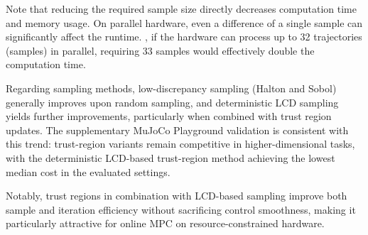 Note that reducing the required sample size directly decreases computation time and memory usage. 
On parallel hardware, even a difference of a single sample can significantly affect the runtime. 
\Eg, if the hardware can process up to 32 trajectories (samples) in parallel, requiring 33 samples would effectively double the computation time.

Regarding sampling methods, low-discrepancy sampling (Halton and Sobol) generally improves upon random sampling, and deterministic \ac{LCD} sampling yields further improvements, particularly when combined with trust region updates.
The supplementary MuJoCo Playground validation is consistent with this trend: trust-region variants remain competitive in higher-dimensional tasks, with the deterministic \ac{LCD}-based trust-region method achieving the lowest median cost in the evaluated settings.

Notably, trust regions in combination with \ac{LCD}-based sampling improve both sample and iteration efficiency without sacrificing control smoothness, making it particularly attractive for online \ac{MPC} on resource-constrained hardware.
